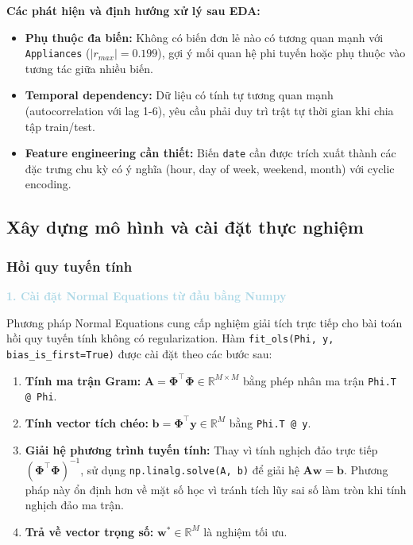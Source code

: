 \noindent\textbf{Các phát hiện và định hướng xử lý sau EDA:}
\begin{itemize}
    \item \textbf{Phụ thuộc đa biến:} Không có biến đơn lẻ nào có tương quan mạnh với \texttt{Appliances} ($|r_{max}| = 0.199$), gợi ý mối quan hệ phi tuyến hoặc phụ thuộc vào tương tác giữa nhiều biến. 

    \item \textbf{Temporal dependency:} Dữ liệu có tính tự tương quan mạnh (autocorrelation với lag 1-6), yêu cầu phải duy trì trật tự thời gian khi chia tập train/test. 

    \item \textbf{Feature engineering cần thiết:} Biến \texttt{date} cần được trích xuất thành các đặc trưng chu kỳ có ý nghĩa (hour, day of week, weekend, month) với cyclic encoding. 
\end{itemize}

\subsection{Xây dựng mô hình và cài đặt thực nghiệm}

\subsubsection{Hồi quy tuyến tính}

\vspace{0.5em}
\noindent\textcolor{lightblue}{\textbf{1. Cài đặt Normal Equations từ đầu bằng Numpy}}
\vspace{0.5em}

Phương pháp Normal Equations cung cấp nghiệm giải tích trực tiếp cho bài toán hồi quy tuyến tính không có regularization. Hàm \texttt{fit\_ols(Phi, y, bias\_is\_first=True)} được cài đặt theo các bước sau:

\begin{enumerate}
    \item \textbf{Tính ma trận Gram:}
          $\mathbf{A} = \boldsymbol{\Phi}^{\top}\boldsymbol{\Phi} \in \mathbb{R}^{M \times M}$
          bằng phép nhân ma trận \texttt{Phi.T @ Phi}.

    \item \textbf{Tính vector tích chéo:}
          $\mathbf{b} = \boldsymbol{\Phi}^{\top}\mathbf{y} \in \mathbb{R}^{M}$
          bằng \texttt{Phi.T @ y}.

    \item \textbf{Giải hệ phương trình tuyến tính:} Thay vì tính nghịch đảo trực tiếp
          $(\boldsymbol{\Phi}^{\top}\boldsymbol{\Phi})^{-1}$, sử dụng
          \texttt{np.linalg.solve(A, b)} để giải hệ $\mathbf{A}\mathbf{w} = \mathbf{b}$.
          Phương pháp này ổn định hơn về mặt số học vì tránh tích lũy sai số làm tròn
          khi tính nghịch đảo ma trận.

    \item \textbf{Trả về vector trọng số:}
          $\mathbf{w}^* \in \mathbb{R}^{M}$ là nghiệm tối ưu.
\end{enumerate}

